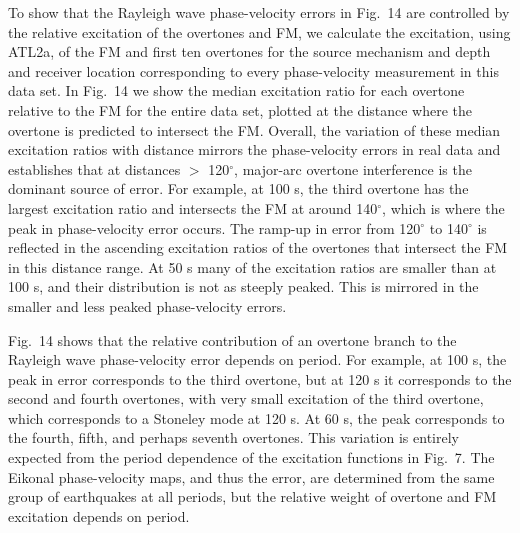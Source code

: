 \documentclass[extra,mreferee]{gji}
\begin{document}
To show that the Rayleigh wave phase-velocity errors in Fig.\ 14 are controlled by the relative excitation of the overtones and FM, we calculate the excitation, using ATL2a, of the FM and first ten overtones for the source mechanism and depth and receiver location corresponding to every phase-velocity measurement in this data set. In Fig.\ 14 we show the median excitation ratio for each overtone relative to the FM for the entire data set, plotted at the distance where the overtone is predicted to intersect the FM. Overall, the variation of these median excitation ratios with distance mirrors the phase-velocity errors in real data and establishes that at distances $>$ 120$^\circ$, major-arc overtone interference is the dominant source of error. For example, at 100 s, the third overtone has the largest excitation ratio and intersects the FM at around 140$^\circ$, which is where the peak in phase-velocity error occurs. The ramp-up in error from 120$^\circ$ to 140$^\circ$ is reflected in the ascending excitation ratios of the overtones that intersect the FM in this distance range. At 50 s many of the excitation ratios are smaller than at 100 s, and their distribution is not as steeply peaked. This is mirrored in the smaller and less peaked phase-velocity errors.

Fig.\ 14 shows that the relative contribution of an overtone branch to the Rayleigh wave phase-velocity error depends on period. For example, at 100 s, the peak in error corresponds to the third overtone, but at 120 s it corresponds to the second and fourth overtones, with very small excitation of the third overtone, which corresponds to a Stoneley mode at 120 s. At 60 s, the peak corresponds to the fourth, fifth, and perhaps seventh overtones. This variation is entirely expected from the period dependence of the excitation functions in Fig.\ 7. The Eikonal phase-velocity maps, and thus the error, are determined from the same group of earthquakes at all periods, but the relative weight of overtone and FM excitation depends on period.
\end{document}
